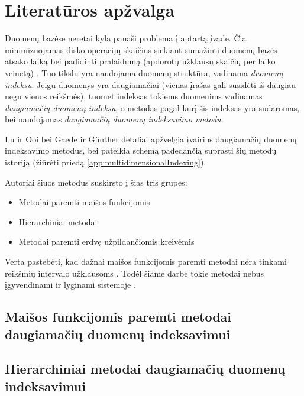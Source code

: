 \section{Literatūros apžvalga}

Duomenų bazėse neretai kyla panaši problema į aptartą įvade.
Čia minimizuojamas disko operacijų skaičius siekiant sumažinti duomenų bazės atsako laiką bei padidinti pralaidumą (apdorotų užklausų skaičių per laiko veinetą) \cite{garcia2000database}.
Tuo tikslu yra naudojama duomenų struktūra, vadinama {\it duomenų indeksu}.
Jeigu duomenys yra daugiamačiai (vienas įrašas gali susidėti iš daugiau negu vienos reikšmės), tuomet indeksas tokiems duomenims vadinamas {\it daugiamačių duomenų indeksu}, o metodas pagal kurį šis indeksas yra sudaromas, bei naudojamas {\it daugiamačių duomenų indeksavimo metodu}.


Lu ir Ooi \cite{lu1993spatial} bei Gaede ir Günther \cite{gaede1998multidimensional} detaliai apžvelgia įvairius daugiamačių duomenų indeksavimo metodus, bei pateikia schemą padedančią suprasti šių metodų istoriją (žiūrėti priedą \ref{app:multidimensionalIndexing}).

Autoriai šiuos metodus suskirsto į šias tris grupes:
\begin{itemize}
	\item Metodai paremti maišos funkcijomis
	\item Hierarchiniai metodai
	\item Metodai paremti erdvę užpildančiomis kreivėmis \cite{bader2012space}
\end{itemize}

Verta pastebėti, kad dažnai maišos funkcijomis paremti metodai nėra tinkami reikšmių intervalo užklausoms \cite{nievergelt1981grid} \cite{tamminen1982excell}. %
Todėl šiame darbe tokie metodai nebus įgyvendinami ir lyginami sistemoje \cite{NeurotechnologyMegamatcherAccelerator}.


\subsection{Maišos funkcijomis paremti metodai daugiamačių duomenų indeksavimui}


\subsection{Hierarchiniai metodai daugiamačių duomenų indeksavimui}


